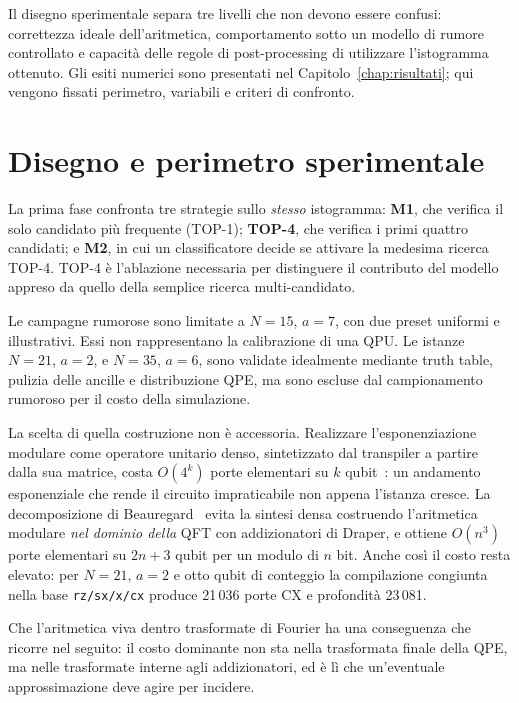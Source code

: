 \begin{onehalfspace}

Il disegno sperimentale separa tre livelli che non devono essere confusi:
correttezza ideale dell'aritmetica, comportamento sotto un modello di rumore
controllato e capacità delle regole di post-processing di utilizzare
l'istogramma ottenuto. Gli esiti numerici sono presentati nel
Capitolo~\ref{chap:risultati}; qui vengono fissati perimetro, variabili e
criteri di confronto.

\section{Disegno e perimetro sperimentale}
\label{sec:obiettivi_sperimentali}

La prima fase confronta tre strategie sullo \emph{stesso} istogramma:
\textbf{M1}, che verifica il solo candidato più frequente (TOP-1);
\textbf{TOP-4}, che verifica i primi quattro candidati; e \textbf{M2}, in
cui un classificatore decide se attivare la medesima ricerca TOP-4. TOP-4 è
l'ablazione necessaria per distinguere il contributo del modello appreso da
quello della semplice ricerca multi-candidato.

Le campagne rumorose sono limitate a $N=15$, $a=7$, con due preset uniformi
e illustrativi. Essi non rappresentano la calibrazione di una QPU. Le
istanze $N=21$, $a=2$, e $N=35$, $a=6$, sono validate idealmente mediante
truth table, pulizia delle ancille e distribuzione QPE, ma sono escluse dal
campionamento rumoroso per il costo della simulazione.

La scelta di quella costruzione non è accessoria. Realizzare l'esponenziazione modulare
come operatore unitario denso, sintetizzato dal transpiler a partire dalla sua matrice,
costa $O(4^k)$ porte elementari su $k$ qubit~\cite{Barenco1995}: un andamento esponenziale
che rende il circuito impraticabile non appena l'istanza cresce. La decomposizione di
Beauregard~\cite{beauregard2002} evita la sintesi densa costruendo l'aritmetica modulare
\emph{nel dominio della} \ac{QFT} con addizionatori di Draper, e ottiene $O(n^3)$ porte
elementari su $2n+3$ qubit per un modulo di $n$ bit. Anche così il costo resta elevato: per
$N=21$, $a=2$ e otto qubit di conteggio la compilazione congiunta nella base
\texttt{rz/sx/x/cx} produce 21\,036 porte \ac{CX} e profondità 23\,081.

Che l'aritmetica viva dentro trasformate di Fourier ha una conseguenza che ricorre nel
seguito: il costo dominante non sta nella trasformata finale della \ac{QPE}, ma nelle
trasformate interne agli addizionatori, ed è lì che un'eventuale approssimazione deve agire
per incidere.


\end{onehalfspace}
